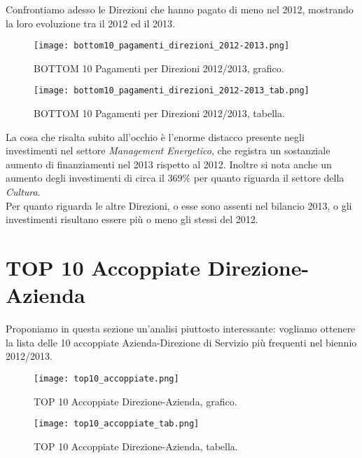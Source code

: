 			Confrontiamo adesso le Direzioni che hanno pagato di meno nel 2012, mostrando la loro evoluzione tra il 2012 ed il 2013.
	
			\begin{figure}[h!]
				\centering
					\texttt{[image: bottom10\_pagamenti\_direzioni\_2012-2013.png]}
				\caption{BOTTOM 10 Pagamenti per Direzioni 2012/2013, grafico.}
				\label{fig:bottom10_pagamenti_direzioni_2012-2013}
			\end{figure}
			
			\begin{figure}[h!]
				\centering
					\texttt{[image: bottom10\_pagamenti\_direzioni\_2012-2013\_tab.png]}
				\caption{BOTTOM 10 Pagamenti per Direzioni 2012/2013, tabella.}
				\label{fig:bottom10_pagamenti_direzioni_2012-2013_tab}
			\end{figure}
			
			La cosa che risalta subito all'occhio è l'enorme distacco presente negli investimenti nel settore \textit{Management Energetico}, che registra un sostanziale aumento di finanziamenti nel 2013 rispetto al 2012. Inoltre si nota anche un aumento degli investimenti di circa il $369\%$ per quanto riguarda il settore della \textit{Cultura}.\\
			Per quanto riguarda le altre Direzioni, o esse sono assenti nel bilancio 2013, o gli investimenti risultano essere più o meno gli stessi del 2012.
			
			\FloatBarrier
	
	\section{TOP 10 Accoppiate Direzione-Azienda} \label{sec:accoppiate}
		
		Proponiamo in questa sezione un'analisi piuttosto interessante: vogliamo ottenere la lista delle 10 accoppiate Azienda-Direzione di Servizio più frequenti nel biennio 2012/2013.
		
		\begin{figure}[h!]
			\centering
				\texttt{[image: top10\_accoppiate.png]}
			\caption{TOP 10 Accoppiate Direzione-Azienda, grafico.}
			\label{fig:top10_accoppiate}
		\end{figure}
		
		\begin{figure}[h!]
			\centering
				\texttt{[image: top10\_accoppiate\_tab.png]}
			\caption{TOP 10 Accoppiate Direzione-Azienda, tabella.}
			\label{fig:top10_accoppiate_tab}
		\end{figure}
		
